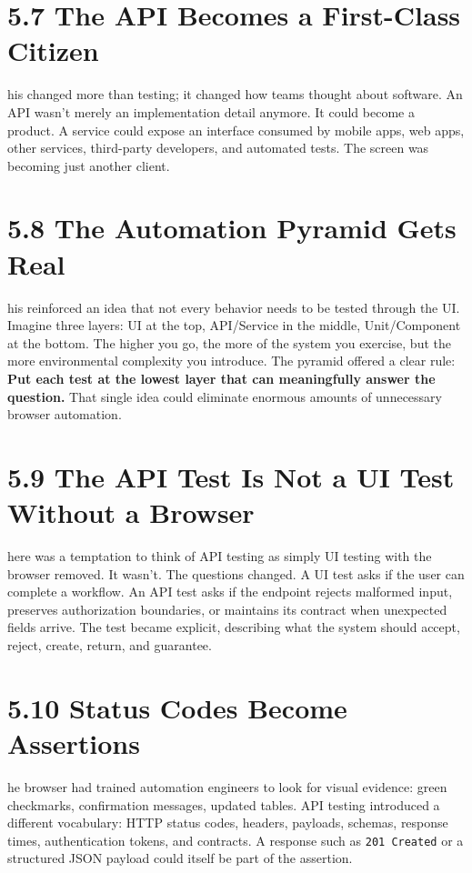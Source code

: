 \documentclass[11pt, a4paper, openany]{book}
\newcommand{\initialcap}[1]{{\fontfamily{lmss}\selectfont\huge\textbf{#1}}}
\begin{document}
\section{5.7 The API Becomes a First-Class Citizen}
\noindent \initialcap{T}his changed more than testing; it changed how teams thought about software. An API wasn't merely an implementation detail anymore. It could become a product. A service could expose an interface consumed by mobile apps, web apps, other services, third-party developers, and automated tests. The screen was becoming just another client.

\section{5.8 The Automation Pyramid Gets Real}
\noindent \initialcap{T}his reinforced an idea that not every behavior needs to be tested through the UI. Imagine three layers: UI at the top, API/Service in the middle, Unit/Component at the bottom. The higher you go, the more of the system you exercise, but the more environmental complexity you introduce. The pyramid offered a clear rule: \textbf{Put each test at the lowest layer that can meaningfully answer the question.} That single idea could eliminate enormous amounts of unnecessary browser automation.

\section{5.9 The API Test Is Not a UI Test Without a Browser}
\noindent \initialcap{T}here was a temptation to think of API testing as simply UI testing with the browser removed. It wasn't. The questions changed. A UI test asks if the user can complete a workflow. An API test asks if the endpoint rejects malformed input, preserves authorization boundaries, or maintains its contract when unexpected fields arrive. The test became explicit, describing what the system should accept, reject, create, return, and guarantee.

\section{5.10 Status Codes Become Assertions}
\noindent \initialcap{T}he browser had trained automation engineers to look for visual evidence: green checkmarks, confirmation messages, updated tables. API testing introduced a different vocabulary: HTTP status codes, headers, payloads, schemas, response times, authentication tokens, and contracts. A response such as \texttt{201 Created} or a structured JSON payload could itself be part of the assertion.
\end{document}
